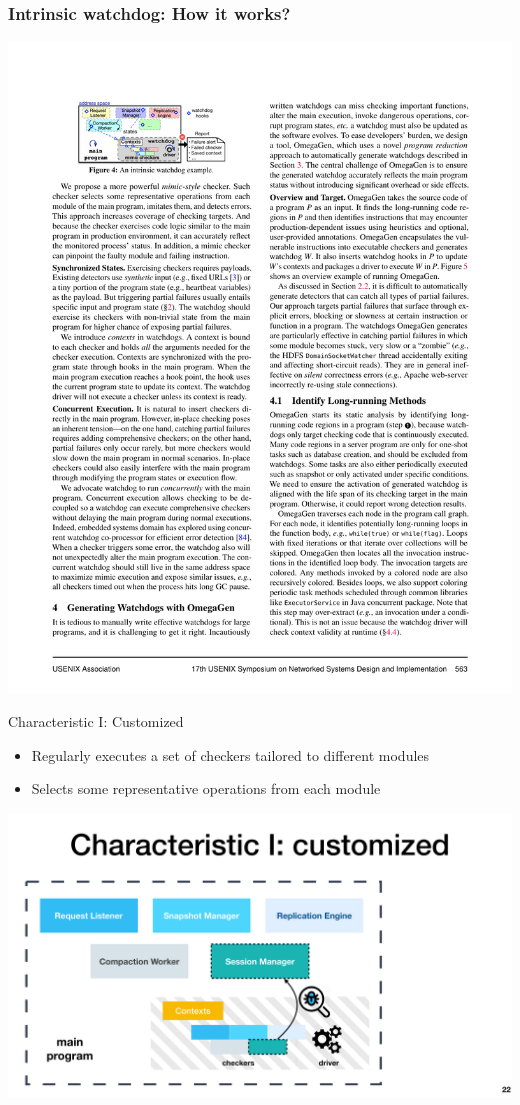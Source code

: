 \documentclass[aspectratio=169]{beamer}
\begin{document}
\begin{frame}
    \frametitle{Intrinsic watchdog: How it works?}

    \begin{center}
        \includegraphics[width=.9\textwidth]{fig/exmaple}
    \end{center}

\end{frame}

\begin{frame}{Characteristic I: Customized}
    \begin{itemize}
        \item Regularly executes a set of checkers tailored to different modules
        \item Selects some representative operations from each
              module
    \end{itemize}

    \begin{center}
        \includegraphics[width=.75\textwidth]{fig/customized}
    \end{center}
\end{frame}
\end{document}

